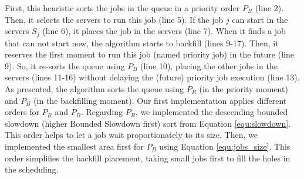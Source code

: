 First, this heuristic sorts the jobs in the queue in a priority order $P_{R}$ (line 2). Then, it selects the servers to run this job (line 5). If the job $j$ can start in the servers $S_j$ (line 6), it places the job in the servers (line 7). When it finds a job that can not start now, the algorithm starts to backfill (lines 9-17). Then, it reserves the first moment to run this job (named priority job) in the future (line 9). So, it re-sorts the queue using $P_{B}$ (line 10), placing the other jobs in the servers (lines 11-16) without delaying the (future) priority job execution (line 13). As presented, the algorithm sorts the queue using $P_{R}$ (in the priority moment) and $P_{B}$ (in the backfilling moment). Our first implementation applies different orders for $P_{R}$ and $P_{B}$. Regarding $P_{R}$, we implemented the descending bounded slowdown (higher Bounded Slowdown first) sort from Equation \ref{equ:slowdown}. This order helps to let a job wait proportionately to its size. Then, we implemented the smallest area first for $P_{B}$ using Equation \ref{equ:jobs_size}. This order simplifies the backfill placement, taking small jobs first to fill the holes in the scheduling.

